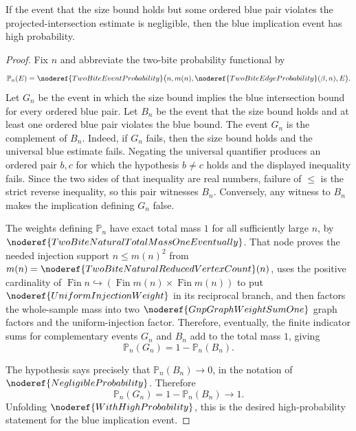 \begin{helper}
If the event that the size bound holds but some ordered blue pair violates
the projected-intersection estimate is negligible, then the blue implication
event has high probability.
\end{helper}
\begin{proof}
Fix \(n\) and abbreviate the two-bite probability functional by
\[
\mathbb P_n(E)=
\noderef{TwoBiteEventProbability}\bigl(n,m(n),
\noderef{TwoBiteEdgeProbability}(\beta,n),E\bigr).
\]
Let \(G_n\) be the event in which the size bound implies the blue
intersection bound for every ordered blue pair.  Let \(B_n\) be the event
that the size bound holds and at least one ordered blue pair violates the
blue bound.  The event \(G_n\) is the complement of \(B_n\).  Indeed, if
\(G_n\) fails, then the size bound holds and the universal blue estimate
fails.  Negating the universal quantifier produces an ordered pair \(b,c\)
for which the hypothesis \(b\ne c\) holds and the displayed inequality
fails.  Since the two sides of that inequality are real numbers, failure of
\(\le\) is the strict reverse inequality, so this pair witnesses \(B_n\).
Conversely, any witness to \(B_n\) makes the implication defining \(G_n\)
false.

The weights defining \(\mathbb P_n\) have exact total mass \(1\) for all
sufficiently large \(n\), by
\(\noderef{TwoBiteNaturalTotalMassOneEventually}\).  That node proves the
needed injection support \(n\le m(n)^2\) from
\(m(n)=\noderef{TwoBiteNaturalReducedVertexCount}(n)\), uses the positive
cardinality of
\(\operatorname{Fin}n\hookrightarrow(\operatorname{Fin}m(n)\times
\operatorname{Fin}m(n))\) to put \(\noderef{UniformInjectionWeight}\) in its
reciprocal branch, and then factors the whole-sample mass into two
\(\noderef{GnpGraphWeightSumOne}\) graph factors and the uniform-injection
factor.  Therefore, eventually, the finite indicator sums for complementary
events \(G_n\) and \(B_n\) add to the total mass \(1\), giving
\[
\mathbb P_n(G_n)=1-\mathbb P_n(B_n).
\]

The hypothesis says precisely that \(\mathbb P_n(B_n)\to0\), in the notation
of \(\noderef{NegligibleProbability}\).  Therefore
\[
\mathbb P_n(G_n)=1-\mathbb P_n(B_n)\to1.
\]
Unfolding \(\noderef{WithHighProbability}\), this is the desired
high-probability statement for the blue implication event.
\end{proof}
